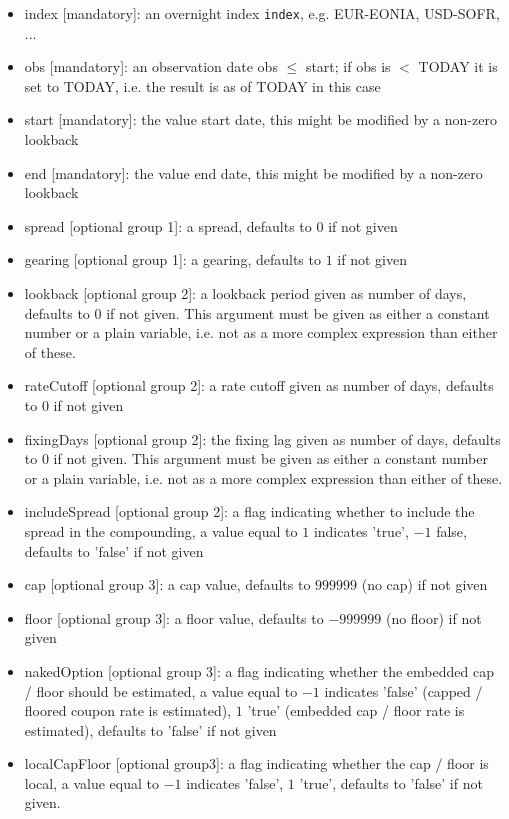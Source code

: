 \begin{itemize}
\item index [mandatory]: an overnight index \verb+index+, e.g. EUR-EONIA, USD-SOFR, ...
\item obs [mandatory]: an observation date obs $\leq$ start; if obs is $<$ TODAY it is set to TODAY, i.e. the result is
  as of TODAY in this case
\item start [mandatory]: the value start date, this might be modified by a non-zero lookback
\item end [mandatory]: the value end date, this might be modified by a non-zero lookback
\item spread [optional group 1]: a spread, defaults to $0$ if not given
\item gearing [optional group 1]: a gearing, defaults to $1$ if not given
\item lookback [optional group 2]: a lookback period given as number of days, defaults to $0$ if not given. This
  argument must be given as either a constant number or a plain variable, i.e. not as a more complex expression than
  either of these.
\item rateCutoff [optional group 2]: a rate cutoff given as number of days, defaults to $0$ if not given
\item fixingDays [optional group 2]: the fixing lag given as number of days, defaults to $0$ if not given. This argument
  must be given as either a constant number or a plain variable, i.e. not as a more complex expression than either of
  these.
\item includeSpread [optional group 2]: a flag indicating whether to include the spread in the compounding, a value equal to $1$ indicates 'true', $-1$ false, defaults to 'false' if not given
\item cap [optional group 3]: a cap value, defaults to $999999$ (no cap) if not given
\item floor [optional group 3]: a floor value, defaults to $-999999$ (no floor) if not given
\item nakedOption [optional group 3]: a flag indicating whether the embedded cap / floor should be estimated, a value equal to $-1$ indicates 'false' (capped / floored coupon rate is estimated), $1$ 'true' (embedded cap / floor rate is estimated), defaults to 'false' if not given
\item localCapFloor [optional group3]: a flag indicating whether the cap / floor is local, a value equal to $-1$ indicates 'false', $1$ 'true', defaults to 'false' if not given.
\end{itemize}

